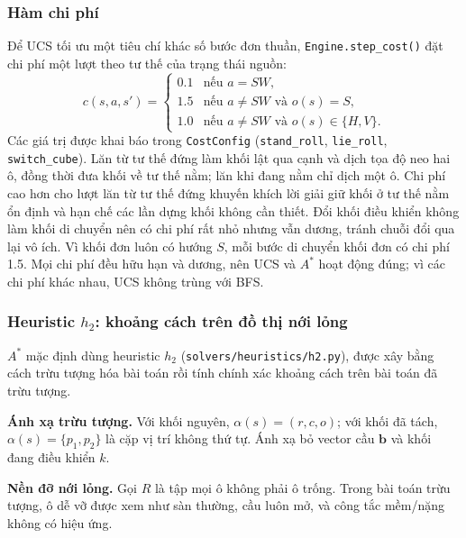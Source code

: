 \subsubsection{Hàm chi phí}
Để UCS tối ưu một tiêu chí khác số bước đơn thuần, \texttt{Engine.step\_cost()} đặt chi phí một lượt theo tư thế của trạng thái nguồn:
\begin{equation}
    c(s,a,s')=
    \begin{cases}
        0.1 & \text{nếu } a=\mathit{SW},\\
        1.5 & \text{nếu } a\neq\mathit{SW} \text{ và } o(s)=S,\\
        1.0 & \text{nếu } a\neq\mathit{SW} \text{ và } o(s)\in\{H,V\}.
    \end{cases}
    \label{eq:ucs_cost}
\end{equation}
Các giá trị được khai báo trong \texttt{CostConfig} (\texttt{stand\_roll}, \texttt{lie\_roll}, \texttt{switch\_cube}). Lăn từ tư thế đứng làm khối lật qua cạnh và dịch tọa độ neo hai ô, đồng thời đưa khối về tư thế nằm; lăn khi đang nằm chỉ dịch một ô. Chi phí cao hơn cho lượt lăn từ tư thế đứng khuyến khích lời giải giữ khối ở tư thế nằm ổn định và hạn chế các lần dựng khối không cần thiết. Đổi khối điều khiển không làm khối di chuyển nên có chi phí rất nhỏ nhưng vẫn dương, tránh chuỗi đổi qua lại vô ích. Vì khối đơn luôn có hướng $S$, mỗi bước di chuyển khối đơn có chi phí 1.5. Mọi chi phí đều hữu hạn và dương, nên UCS và $A^*$ hoạt động đúng; vì các chi phí khác nhau, UCS không trùng với BFS.

\subsubsection{Heuristic $h_2$: khoảng cách trên đồ thị nới lỏng}
$A^*$ mặc định dùng heuristic $h_2$ (\texttt{solvers/heuristics/h2.py}), được xây bằng cách trừu tượng hóa bài toán rồi tính chính xác khoảng cách trên bài toán đã trừu tượng.

\textbf{Ánh xạ trừu tượng.} Với khối nguyên, $\alpha(s)=(r,c,o)$; với khối đã tách, $\alpha(s)=\{p_1,p_2\}$ là cặp vị trí không thứ tự. Ánh xạ bỏ vector cầu $\mathbf{b}$ và khối đang điều khiển $k$.

\textbf{Nền đỡ nới lỏng.} Gọi $R$ là tập mọi ô không phải ô trống. Trong bài toán trừu tượng, ô dễ vỡ được xem như sàn thường, cầu luôn mở, và công tắc mềm/nặng không có hiệu ứng.


